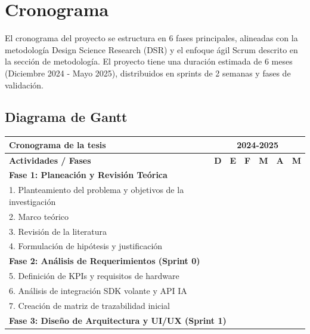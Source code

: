 \section{Cronograma}

El cronograma del proyecto se estructura en 6 fases principales, alineadas con la metodología Design Science Research (DSR) y el enfoque ágil Scrum descrito en la sección de metodología. El proyecto tiene una duración estimada de 6 meses (Diciembre 2024 - Mayo 2025), distribuidos en sprints de 2 semanas y fases de validación.

\subsection{Diagrama de Gantt}

\begin{table}[H]
\centering
\setlength{\tabcolsep}{3pt}
\scriptsize
\begin{tabular}{|l|c|c|c|c|c|c|}
\hline
\rowcolor{gray!30}
\textbf{Cronograma de la tesis} & \multicolumn{6}{c|}{\textbf{2024-2025}} \\
\hline
\rowcolor{gray!30}
\textbf{Actividades / Fases} & \textbf{D} & \textbf{E} & \textbf{F} & \textbf{M} & \textbf{A} & \textbf{M} \\
\hline
\multicolumn{7}{|l|}{\cellcolor{gray!20}\textbf{Fase 1: Planeación y Revisión Teórica}} \\
\hline
1. Planteamiento del problema y objetivos de la investigación & \cellcolor{gray!50} & \cellcolor{gray!50} & & & & \\
\hline
2. Marco teórico & \cellcolor{gray!50} & \cellcolor{gray!50} & & & & \\
\hline
3. Revisión de la literatura & \cellcolor{gray!50} & \cellcolor{gray!50} & & & & \\
\hline
4. Formulación de hipótesis y justificación & \cellcolor{gray!50} & & & & & \\
\hline
\multicolumn{7}{|l|}{\cellcolor{gray!20}\textbf{Fase 2: Análisis de Requerimientos (Sprint 0)}} \\
\hline
5. Definición de KPIs y requisitos de hardware & & \cellcolor{gray!50} & & & & \\
\hline
6. Análisis de integración SDK volante y API IA & & \cellcolor{gray!50} & & & & \\
\hline
7. Creación de matriz de trazabilidad inicial & & \cellcolor{gray!50} & & & & \\
\hline
\multicolumn{7}{|l|}{\cellcolor{gray!20}\textbf{Fase 3: Diseño de Arquitectura y UI/UX (Sprint 1)}} \\

\end{tabular}
\end{table}
